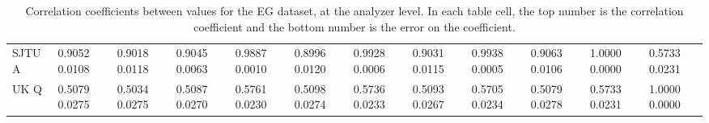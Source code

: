 \begin{landscape}
\begin{table}
\begin{tabularx}{1\linewidth}{@{\extracolsep{\fill}}lXXXXXXXXXXX}
	SJTU A & 0.9052 0.0108 & 0.9018 0.0118 & 0.9045 0.0063 & 0.9887 0.0010 & 0.8996 0.0120 & 0.9928 0.0006 & 0.9031 0.0115 & 0.9938 0.0005 & 0.9063 0.0106 & 1.0000 0.0000 & 0.5733 0.0231  \\
	UK Q   & 0.5079 0.0275 & 0.5034 0.0275 & 0.5087 0.0270 & 0.5761 0.0230 & 0.5098 0.0274 & 0.5736 0.0233 & 0.5093 0.0267 & 0.5705 0.0234 & 0.5079 0.0278 & 0.5733 0.0231 & 1.0000 0.0000  \\
  \bottomrule
\end{tabularx}
\caption[]{Correlation coefficients between \R values for the EG dataset, at the analyzer level. In each table cell, the top number is the correlation coefficient and the bottom number is the error on the coefficient.}
\label{tab:Corrs_EG_analyzer}
\end{table}
\end{landscape}





\clearpage

